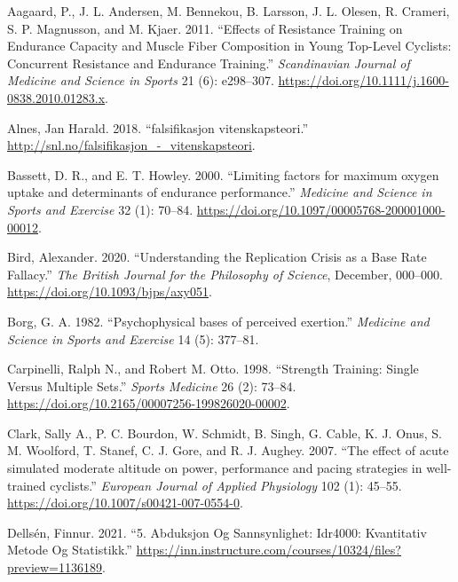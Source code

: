 \documentclass[
]{book}
\newlength{\cslhangindent}
\newlength{\cslentryspacingunit} %
\newenvironment{CSLReferences}[2] %
 {%
  \setlength{\parindent}{0pt}
  \ifodd #1
  \let\oldpar\par
  \def\par{\hangindent=\cslhangindent\oldpar}
  \fi
  \setlength{\parskip}{#2\cslentryspacingunit}
 }%
 {}
\begin{document}
\hypertarget{refs}{}
\begin{CSLReferences}{1}{0}
\leavevmode{}%
Aagaard, P., J. L. Andersen, M. Bennekou, B. Larsson, J. L. Olesen, R.
Crameri, S. P. Magnusson, and M. Kjaer. 2011. {``Effects of Resistance
Training on Endurance Capacity and Muscle Fiber Composition in Young
Top-Level Cyclists: Concurrent Resistance and Endurance Training.''}
\emph{Scandinavian Journal of Medicine and Science in Sports} 21 (6):
e298--307. \url{https://doi.org/10.1111/j.1600-0838.2010.01283.x}.

\leavevmode{}%
Alnes, Jan Harald. 2018. {``falsifikasjon {\textendash}
vitenskapsteori.''} \url{http://snl.no/falsifikasjon_-_vitenskapsteori}.

\leavevmode{}%
Bassett, D. R., and E. T. Howley. 2000. {``Limiting factors for maximum
oxygen uptake and determinants of endurance performance.''}
\emph{Medicine and Science in Sports and Exercise} 32 (1): 70--84.
\url{https://doi.org/10.1097/00005768-200001000-00012}.

\leavevmode{}%
Bird, Alexander. 2020. {``Understanding the Replication Crisis as a Base
Rate Fallacy.''} \emph{The British Journal for the Philosophy of
Science}, December, 000--000. \url{https://doi.org/10.1093/bjps/axy051}.

\leavevmode{}%
Borg, G. A. 1982. {``Psychophysical bases of perceived exertion.''}
\emph{Medicine and Science in Sports and Exercise} 14 (5): 377--81.

\leavevmode{}%
Carpinelli, Ralph N., and Robert M. Otto. 1998. {``Strength Training:
Single Versus Multiple Sets.''} \emph{Sports Medicine} 26 (2): 73--84.
\url{https://doi.org/10.2165/00007256-199826020-00002}.

\leavevmode{}%
Clark, Sally A., P. C. Bourdon, W. Schmidt, B. Singh, G. Cable, K. J.
Onus, S. M. Woolford, T. Stanef, C. J. Gore, and R. J. Aughey. 2007.
{``The effect of acute simulated moderate altitude on power, performance
and pacing strategies in well-trained cyclists.''} \emph{European
Journal of Applied Physiology} 102 (1): 45--55.
\url{https://doi.org/10.1007/s00421-007-0554-0}.

\leavevmode{}%
Dellsén, Finnur. 2021. {``5. Abduksjon Og Sannsynlighet: Idr4000:
Kvantitativ Metode Og Statistikk.''}
\url{https://inn.instructure.com/courses/10324/files?preview=1136189}.


\end{CSLReferences}
\end{document}
